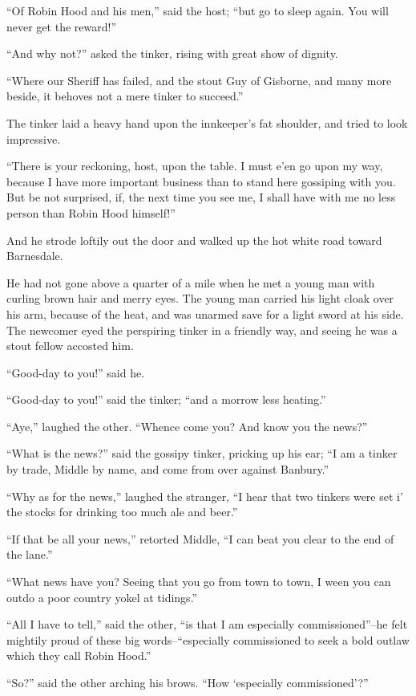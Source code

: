 ``Of Robin Hood and his men,'' said the host; ``but go to sleep again.
You will never get the reward!''

``And why not?'' asked the tinker, rising with great show of dignity.

``Where our Sheriff has failed, and the stout Guy of Gisborne, and many
more beside, it behoves not a mere tinker to succeed.''

The tinker laid a heavy hand upon the innkeeper's fat shoulder, and
tried to look impressive.

``There is your reckoning, host, upon the table. I must e'en go upon my
way, because I have more important business than to stand here gossiping
with you. But be not surprised, if, the next time you see me, I shall
have with me no less person than Robin Hood himself!''

And he strode loftily out the door and walked up the hot white road
toward Barnesdale.

He had not gone above a quarter of a mile when he met a young man with
curling brown hair and merry eyes. The young man carried his light cloak
over his arm, because of the heat, and was unarmed save for a light
sword at his side. The newcomer eyed the perspiring tinker in a friendly
way, and seeing he was a stout fellow accosted him.

``Good-day to you!'' said he.

``Good-day to you!'' said the tinker; ``and a morrow less heating.''

``Aye,'' laughed the other. ``Whence come you? And know you the news?''

``What is the news?'' said the gossipy tinker, pricking up his ear; ``I
am a tinker by trade, Middle by name, and come from over against
Banbury.''

``Why as for the news,'' laughed the stranger, ``I hear that two tinkers
were set i' the stocks for drinking too much ale and beer.''

``If that be all your news,'' retorted Middle, ``I can beat you clear to
the end of the lane.''

``What news have you? Seeing that you go from town to town, I ween you
can outdo a poor country yokel at tidings.''

``All I have to tell,'' said the other, ``is that I am especially
commissioned''--he felt mightily proud of these big words--``especially
commissioned to seek a bold outlaw which they call Robin Hood.''

``So?'' said the other arching his brows. ``How `especially
commissioned'?''

